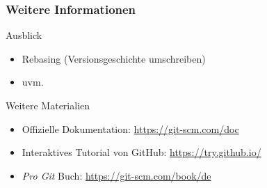 \documentclass[
	ngerman, %
	aspectratio=169, %
	color={accentcolor=8b},
	colorframetitle=true,%
	authorontitle=true
]{tudabeamer}
\begin{document}
			\begin{frame}
				\frametitle{Weitere Informationen}
					\begin{block}{Ausblick}
						\begin{itemize}
							\item Rebasing (Versionsgeschichte umschreiben)
							\item uvm.
						\end{itemize}
					\end{block}
					\begin{block}{Weitere Materialien}
						\begin{itemize}
							\item Offizielle Dokumentation: \href{https://git-scm.com/doc}{https://git-scm.com/doc}
							\item Interaktives Tutorial von GitHub: \href{https://try.github.io/}{https://try.github.io/}
							\item \textit{Pro Git} Buch: \href{https://git-scm.com/book/de}{https://git-scm.com/book/de}
						\end{itemize}
					\end{block}
			\end{frame}
	
\end{document}
